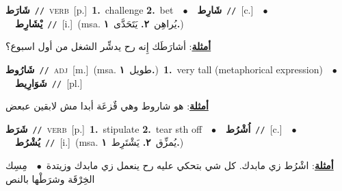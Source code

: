\documentclass[10pt,a4paper,twoside]{article} %
\begin{document}
\begin{multicols}{2}
{\setlength\topsep{0pt}\textbf{\foreignlanguage{arabic}{شَارَط}}\ {\color{gray}\texttt{//}\color{black}}\ \textsc{verb}\ [p.]\ \textbf{1.}~challenge  \textbf{2.}~bet\ \ $\bullet$\ \ \setlength\topsep{0pt}\textbf{\foreignlanguage{arabic}{شَارِط}}\ {\color{gray}\texttt{//}\color{black}}\ [c.]\ \ $\bullet$\ \ \setlength\topsep{0pt}\textbf{\foreignlanguage{arabic}{يْشَارِط}}\ {\color{gray}\texttt{//}\color{black}}\ [i.]\ \color{gray}(msa. \foreignlanguage{arabic}{يُراهِن}~\foreignlanguage{arabic}{\textbf{٢.}}  \foreignlanguage{arabic}{يَتَحَدَّى}~\foreignlanguage{arabic}{\textbf{١.}})\color{black}\  \begin{flushright}\color{gray}\foreignlanguage{arabic}{\textbf{\underline{\foreignlanguage{arabic}{أمثلة}}}: أشارَطَك إِنه رح يدشِّر الشغل من أول اسبوع؟}\end{flushright}\color{black}} \vspace{2mm}

{\setlength\topsep{0pt}\textbf{\foreignlanguage{arabic}{شَارُوط}}\ {\color{gray}\texttt{//}\color{black}}\ \textsc{adj}\ [m.]\ \color{gray}(msa. \foreignlanguage{arabic}{طويل}~\foreignlanguage{arabic}{\textbf{١.}})\color{black}\ \textbf{1.}~very tall (metaphorical expression)\ \ $\bullet$\ \ \setlength\topsep{0pt}\textbf{\foreignlanguage{arabic}{شَوَارِيط}}\ {\color{gray}\texttt{//}\color{black}}\ [pl.]\  \begin{flushright}\color{gray}\foreignlanguage{arabic}{\textbf{\underline{\foreignlanguage{arabic}{أمثلة}}}: هو شاروط وهي قٌزعَة أبدا مش لابقين عبعض}\end{flushright}\color{black}} \vspace{2mm}

{\setlength\topsep{0pt}\textbf{\foreignlanguage{arabic}{شَرَط}}\ {\color{gray}\texttt{//}\color{black}}\ \textsc{verb}\ [p.]\ \textbf{1.}~stipulate  \textbf{2.}~tear sth off\ \ $\bullet$\ \ \setlength\topsep{0pt}\textbf{\foreignlanguage{arabic}{اُشْرُط}}\ {\color{gray}\texttt{//}\color{black}}\ [c.]\ \ $\bullet$\ \ \setlength\topsep{0pt}\textbf{\foreignlanguage{arabic}{يُشْرُط}}\ {\color{gray}\texttt{//}\color{black}}\ [i.]\ \color{gray}(msa. \foreignlanguage{arabic}{يُمزِّق}~\foreignlanguage{arabic}{\textbf{٢.}}  \foreignlanguage{arabic}{يَشْتَرِط}~\foreignlanguage{arabic}{\textbf{١.}})\color{black}\  \begin{flushright}\color{gray}\foreignlanguage{arabic}{\textbf{\underline{\foreignlanguage{arabic}{أمثلة}}}: اشْرُط زي مابدك. كل شي بتحكي عليه رح ينعمل زي مابدك وزيتدة\ $\bullet$\ \  مِسِك الخِرْقَة وشرَطْها بالنص}\end{flushright}\color{black}} \vspace{2mm}


\end{multicols}
\end{document}
